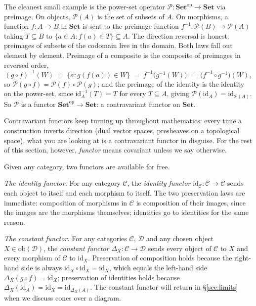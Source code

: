 \begin{remark}
The cleanest small example is the power-set operator
$\mathcal{P} : \mathbf{Set}^{\mathrm{op}} \to \mathbf{Set}$ via
preimage. On objects, $\mathcal{P}(A)$ is the set of subsets of
$A$. On morphisms, a function $f : A \to B$ in $\mathbf{Set}$ is
sent to the preimage function $f^{-1} : \mathcal{P}(B) \to
\mathcal{P}(A)$ taking $T \subseteq B$ to
$\{a \in A : f(a) \in T\} \subseteq A$. The direction reversal
is honest: preimages of subsets of the codomain live in the
domain. Both laws fall out element by element. Preimage of a
composite is the composite of preimages in reversed order,
\[ (g \circ f)^{-1}(W) \; = \; \{a : g(f(a)) \in W\}
   \; = \; f^{-1}\bigl(g^{-1}(W)\bigr) \; = \;
   \bigl(f^{-1} \circ g^{-1}\bigr)(W), \]
so $\mathcal{P}(g \circ f) = \mathcal{P}(f) \circ \mathcal{P}(g)$;
and the preimage of the identity is the identity on the power-set,
since $\mathrm{id}_A^{-1}(T) = T$ for every $T \subseteq A$,
giving $\mathcal{P}(\mathrm{id}_A) = \mathrm{id}_{\mathcal{P}(A)}$.
So $\mathcal{P}$ is a functor $\mathbf{Set}^{\mathrm{op}} \to
\mathbf{Set}$: a contravariant functor on $\mathbf{Set}$.

Contravariant functors keep turning up throughout mathematics:
every time a construction inverts direction (dual vector spaces,
presheaves on a topological space), what you are looking at is
a contravariant functor in disguise. For the rest of this
section, however, \textit{functor} means covariant unless we say
otherwise.
\end{remark}

\begin{example}\label{ex:id-const-functor}
Given any category, two functors are available for free.

\textit{The identity functor.} For any category $\mathcal{C}$,
the \textit{identity functor}
$\mathrm{id}_{\mathcal{C}} : \mathcal{C} \to \mathcal{C}$ sends
each object to itself and each morphism to itself. The two
preservation laws are immediate: composition of morphisms in
$\mathcal{C}$ is composition of their images, since the images
are the morphisms themselves; identities go to identities for
the same reason.

\textit{The constant functor.} For any categories $\mathcal{C}$,
$\mathcal{D}$ and any chosen object $X \in
\mathrm{ob}(\mathcal{D})$, the \textit{constant
functor} $\Delta_X : \mathcal{C} \to
\mathcal{D}$ sends every object of $\mathcal{C}$ to $X$ and every
morphism of $\mathcal{C}$ to $\mathrm{id}_X$. Preservation of
composition holds because the right-hand side is always
$\mathrm{id}_X \circ \mathrm{id}_X = \mathrm{id}_X$, which equals
the left-hand side $\Delta_X(g \circ f) = \mathrm{id}_X$;
preservation of identities holds because
$\Delta_X(\mathrm{id}_A) = \mathrm{id}_X =
\mathrm{id}_{\Delta_X(A)}$. The constant functor will return in
\S\ref{sec:limits} when we discuss cones over a diagram.
\end{example}

